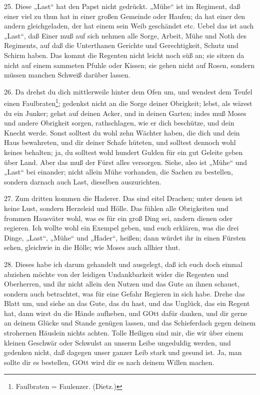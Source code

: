 25. Diese „Last“ hat den Papst nicht gedrückt. „Mühe“ ist im Regiment, daß einer viel zu thun hat in einer großen Gemeinde oder Haufen; da hat einer den andern gleichgeladen, der hat einem sein Weib geschändet etc. Uebel das ist auch „Last“, daß Einer muß auf sich nehmen alle Sorge, Arbeit, Mühe und Noth des Regiments, auf daß die Unterthanen Gerichte und Gerechtigkeit, Schutz und Schirm haben. Das kommt die Regenten nicht leicht noch süß an; sie sitzen da nicht auf einem sammeten Pfuhle oder Kissen; sie gehen nicht auf Rosen, sondern müssen manchen Schweiß darüber lassen.

26. Da drehst du dich mittlerweile hinter dem Ofen um, und wendest dem Teufel einen Faulbraten\footnote{Faulbraten = Faulenzer. (Dietz.)}; gedenkst nicht an die Sorge deiner Obrigkeit; lebst, als wärest du ein Junker; gehst auf deinen Acker, und in deinen Garten; indes muß Moses und andere Obrigkeit sorgen, rathschlagen, wie er dich beschütze, und dein Knecht werde. Sonst solltest du wohl zehn Wächter haben, die dich und dein Haus bewahreten, und dir deiner Schafe hüteten, und solltest dennoch wohl keines behalten; ja, du solltest wohl hundert Gulden für ein gut Geleite geben über Land. Aber das muß der Fürst alles versorgen. Siehe, also ist „Mühe“ und „Last“ bei einander; nicht allein Mühe vorhanden, die Sachen zu bestellen, sondern darnach auch Last, dieselben auszurichten.

27. Zum dritten kommen die Haderer. Das sind eitel Drachen; unter denen ist keine Lust, sondern Herzeleid und Hölle. Das fühlen alle Obrigkeiten und frommen Hausväter wohl, was es für ein groß Ding sei, andern dienen oder regieren. Ich wollte wohl ein Exempel geben, und euch erklären, was die drei Dinge, „Last“, „Mühe“ und „Hader“, heißen; dann würdet ihr in einen Fürsten sehen, gleichwie in die Hölle; wie Moses auch allhier thut.

28. Dieses habe ich darum gehandelt und ausgelegt, daß ich euch doch einmal abziehen möchte von der leidigen Undankbarkeit wider die Regenten und Oberherren, und ihr nicht allein den Nutzen und das Gute an ihnen schauet, sondern auch betrachtet, was für eine Gefahr Regieren in sich habe. Drehe das Blatt um, und siehe an das Gute, das du hast, und das Unglück, das ein Regent hat, dann wirst du die Hände aufheben, und GOtt dafür danken, und dir gerne an deinem Glücke und Stande genügen lassen, und das Schieferdach gegen deinem strohernen Häuslein nichts achten. Tolle Heiligen sind mir, die wir über einem kleinen Geschwär oder Schwulst an unserm Leibe ungeduldig werden, und gedenken nicht, daß dagegen unser ganzer Leib stark und gesund ist. Ja, man sollte dir es bestellen, GOtt wird dir es nach deinem Willen machen.

